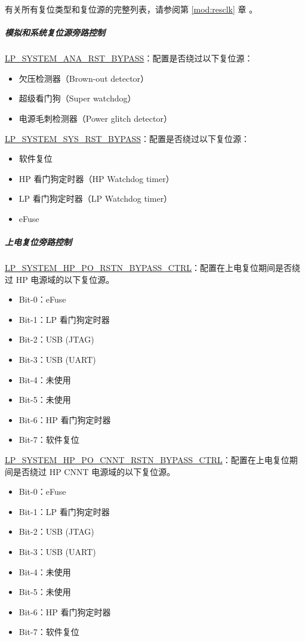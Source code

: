 \documentclass[main\_\_CN.tex]{subfiles}
\begin{document}
有关所有复位类型和复位源的完整列表，请参阅第 \ref{mod:resclk} 章 \textit{}。

\subparagraph{模拟和系统复位源旁路控制}

\hyperref[fielddesc:LPSYSTEMANARSTBYPASS]{LP\_SYSTEM\_ANA\_RST\_BYPASS}：配置是否绕过以下复位源：
\begin{itemize}
    \item 欠压检测器（Brown-out detector）
    \item 超级看门狗（Super watchdog）
    \item 电源毛刺检测器（Power glitch detector）
\end{itemize}

\hyperref[fielddesc:LPSYSTEMSYSRSTBYPASS]{LP\_SYSTEM\_SYS\_RST\_BYPASS}：配置是否绕过以下复位源：
\begin{itemize}
    \item 软件复位
    \item HP 看门狗定时器（HP Watchdog timer）
    \item LP 看门狗定时器（LP Watchdog timer）
    \item eFuse
\end{itemize}

\subparagraph{上电复位旁路控制} \label{sec:power-on-by-pass}

\hyperref[fielddesc:LPSYSTEMHPPORSTNBYPASSCTRL]{LP\_SYSTEM\_HP\_PO\_RSTN\_BYPASS\_CTRL}：配置在上电复位期间是否绕过 HP 电源域的以下复位源。
\begin{itemize}
    \item Bit-0：eFuse
    \item Bit-1：LP 看门狗定时器
    \item Bit-2：USB (JTAG)
    \item Bit-3：USB (UART)
    \item Bit-4：未使用
    \item Bit-5：未使用
    \item Bit-6：HP 看门狗定时器
    \item Bit-7：软件复位
\end{itemize}

\hyperref[fielddesc:LPSYSTEMHPPOCNNTRSTNBYPASSCTRL]{LP\_SYSTEM\_HP\_PO\_CNNT\_RSTN\_BYPASS\_CTRL}：配置在上电复位期间是否绕过 HP CNNT 电源域的以下复位源。
\begin{itemize}
    \item Bit-0：eFuse
    \item Bit-1：LP 看门狗定时器
    \item Bit-2：USB (JTAG)
    \item Bit-3：USB (UART)
    \item Bit-4：未使用
    \item Bit-5：未使用
    \item Bit-6：HP 看门狗定时器
    \item Bit-7：软件复位
\end{itemize}
\end{document}
